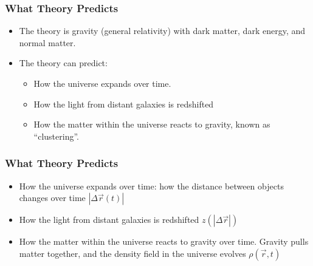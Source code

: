 \documentclass{beamer}
\begin{document}
\frame
{

    \frametitle{What Theory Predicts}


    \begin{itemize}

        \item The theory is gravity (general relativity) with dark matter, dark
            energy, and normal matter.

        \item The theory can predict:
            
            \begin{itemize}

                \item How the universe expands over time.

                \item How the light from distant galaxies is redshifted

                \item How the matter within the universe reacts to gravity, known
                    as ``clustering''.

            \end{itemize}

    \end{itemize}

}


\frame
{

    \frametitle{What Theory Predicts}


    \begin{itemize}

            

        \item How the universe expands over time: how the distance between
            objects changes over time {\color{gold} $|\Delta \vec{r} (t)|$ }

        \item How the light from distant galaxies is redshifted {\color{gold}
            $z(|\Delta \vec{r}|)$}

        \item How the matter within the universe reacts to gravity over time.
            Gravity pulls matter together, and the density field
            in the universe evolves {\color{gold} $\rho(\vec{r},t)$}



    \end{itemize}

}
\end{document}
